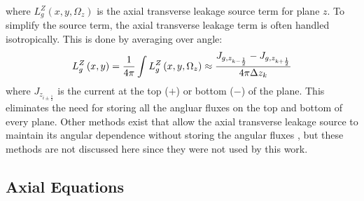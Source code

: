 where $L_{g}^Z\left(x,y,\Omega_z\right)$ is the axial transverse leakage source term for plane $z$.  To simplify the source term, the axial transverse leakage term is often handled isotropically.  This is done by averaging over angle:
\begin{equation}
L_{g}^Z\left(x,y\right) = \frac{1}{4\pi}\intop L_{g}^Z\left(x,y,\Omega_z\right) \approx \frac{J_{g,z_{k-\frac{1}{2}}} - J_{g,z_{k+\frac{1}{2}}}}{4\pi\Delta z_k}
\end{equation}
where $J_{z_{i\pm \frac{1}{2}}}$ is the current at the top ($+$) or bottom ($-$) of the plane.  This eliminates the need for storing all the angluar fluxes on the top and bottom of every plane.  Other methods exist that allow the axial transverse leakage source to maintain its angular dependence without storing the angular fluxes \cite{KelleyBlakeThesis}, but these methods are not discussed here since they were not used by this work.

\subsection{Axial Equations}\label{ss:2d1daxialEq}

